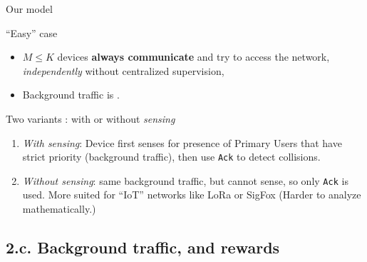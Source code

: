 \documentclass[12pt,english,ignorenonframetext,]{beamer}
\providecommand{\tightlist}{%
  \setlength{\itemsep}{0pt}\setlength{\parskip}{0pt}}
\begin{document}
\begin{frame}[fragile]{Our model}

\begin{block}{``Easy'' case}

\begin{itemize}\tightlist
\item
  \(M \leq K\) devices \textbf{always communicate} and try to access the
  network, \emph{independently} without centralized supervision,
\item
  Background traffic is \iid.
\end{itemize}

\end{block}

\begin{block}{Two variants : with or without \emph{sensing}}

\begin{enumerate}
\def\labelenumi{\arabic{enumi}.}
\tightlist
\item
  \emph{With sensing}: Device first senses for presence of Primary Users that have strict priority
  (background traffic), then use \texttt{Ack} to detect collisions.
\item
  \emph{Without sensing}: same background traffic, but cannot sense, so
  only \texttt{Ack} is used.
  \small{More suited for ``IoT'' networks like LoRa or SigFox} (Harder to
  analyze mathematically.)
\end{enumerate}

\end{block}

\end{frame}



\subsection{\hfill{}2.c. Background traffic, and rewards\hfill{}}
\end{document}
